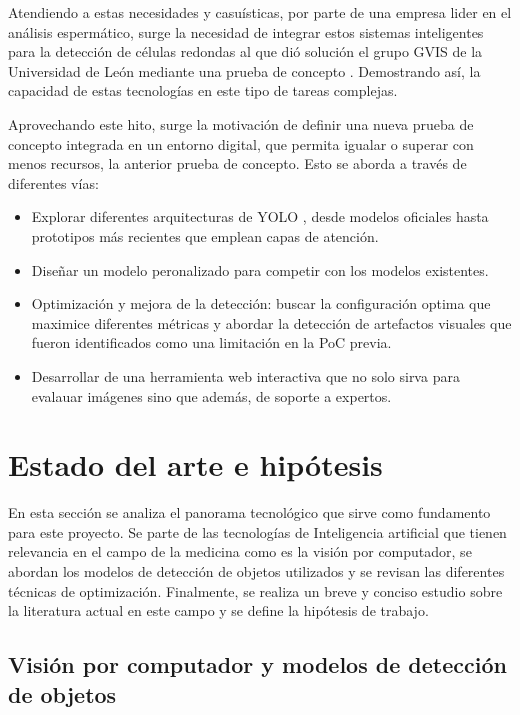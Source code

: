 \documentclass[12pt,a4paper,onecolumn,oneside]{report}
\begin{document}
Atendiendo a estas necesidades y casuísticas, por parte de una empresa lider en el análisis espermático, surge la necesidad de integrar estos sistemas inteligentes para la detección de células redondas al que dió solución el grupo GVIS de la 
Universidad de León mediante una prueba de concepto \cite{HamiltonThorneRoundCells}. Demostrando así, la capacidad de estas tecnologías en este tipo de tareas complejas.

Aprovechando este hito, surge la motivación de definir una nueva prueba de concepto integrada en un entorno digital, que permita igualar o superar con menos recursos, la anterior prueba de concepto. Esto se aborda a través de diferentes vías:

\begin{itemize}
  \item Explorar diferentes arquitecturas de YOLO \cite{ultralytics_models}, desde modelos oficiales hasta prototipos más recientes que emplean capas de atención. 
  \item Diseñar un modelo peronalizado para competir con los modelos existentes.
  \item Optimización y mejora de la detección: buscar la configuración optima que maximice diferentes métricas y abordar la detección de artefactos visuales que fueron identificados como una limitación en la PoC previa. 
  \item Desarrollar de una herramienta web interactiva que no solo sirva para evalauar imágenes sino que además, de soporte a expertos.
\end{itemize}

\section{Estado del arte e hipótesis}
\label{sec:Estado del arte e hipótesis}

En esta sección se analiza el panorama tecnológico que sirve como fundamento para este proyecto. Se parte de las tecnologías de Inteligencia artificial que tienen relevancia en el campo de la medicina como es la 
visión por computador, se abordan los modelos de detección de objetos utilizados y se revisan las diferentes técnicas de optimización. Finalmente, se realiza un breve y conciso estudio sobre la literatura actual 
en este campo y se define la hipótesis de trabajo.

\subsection{Visión por computador y modelos de detección de objetos}
\end{document}

